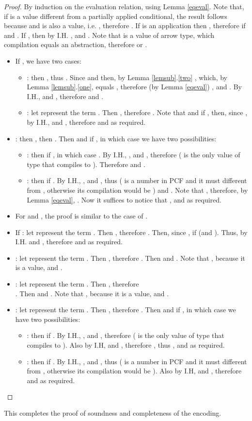 \documentclass{article}
\begin{document}
\begin{proof}
By induction on the evaluation relation, using Lemma \ref{eqeval}. Note
that, if   is a value different from a partially applied conditional,
the result follows because  and  is also a value, i.e.
, therefore .
If  is an application  then ,
therefore  if  and  . If , then by I.H. , and . Note that  is a value of arrow type, which compilation equals
an abstraction, therefore  or . 
\begin{itemize}
\item If , we have two cases:
\begin{itemize}
\item : then , thus . Since
 and  then, by Lemma
\ref{lemsub}.\ref{two} , which, by Lemma \ref{lemsub}.\ref{one}, equals
, therefore (by Lemma \ref{eqeval})
, and . By I.H.,
 and , therefore  and
.
\item : let  represent the term . Then
, therefore
. Note that
 and
 if , then,
since , by I.H.,  and , therefore  and   as required.
\end{itemize}
\item : then , then . Then
 and  if , in
which case we have two possibilities:
\begin{itemize}
\item : then  if , in which case
. By I.H., , and ,
therefore  ( is the only value of type  that compiles
to ). Therefore  and  .
\item : then  if . By
I.H., , and , thus  ( is a number in PCF and it must different from , otherwise
its compilation would be ) and . Note that
, therefore, by Lemma \ref{eqeval},
. Now it suffices to notice that , and  as required.
\end{itemize}
\item For  and , the proof is similar to the case of
.
\item If : let  represent the term  . Then  , therefore
.
Then, since ,
 if
 (and
). Thus, by I.H.
 and  , therefore
 and   as required.
\item : let  represent the term . Then ,
therefore .
Then  and
. Note that
, because it is a
value, and .
\item : let  represent the term . Then , therefore\\
  . Then  and
. Note that
, because
it is a value, and .
\item : let  represent the term
. Then
, therefore . Then  and
 if , in which case
we have two possibilities:
\begin{itemize}
\item : then
 if . By I.H., , and , therefore  ( is the only value of type  that compiles to ). Also by I.H,  and , therefore , thus , and  as required.
\item : then
 if .  By I.H., , and , thus  ( is a number in PCF and it must different from , otherwise its compilation would be ). Also by I.H,  and , therefore  and  as required.
\end{itemize}
\end{itemize}
\end{proof}
This completes the proof of soundness and completeness of the encoding.
\end{document}
